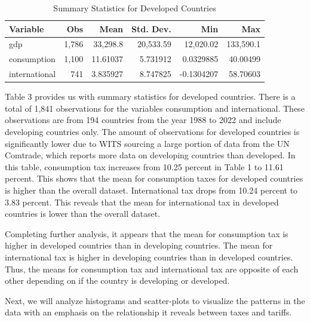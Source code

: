 \documentclass[12pt]{article}
\begin{document}
\begin{table}[h!]
\centering
\caption{Summary Statistics for Developed Countries}
\label{tab:summary_stats}
\begin{tabular}{lrrrrr}
\hline
\textbf{Variable} & \textbf{Obs} & \textbf{Mean} & \textbf{Std. Dev.} & \textbf{Min} & \textbf{Max} \\
\hline
gdp              & 1,786        & 33,298.8      & 20,533.59          & 12,020.02    & 133,590.1    \\
consumption      & 1,100        & 11.61037      & 5.731912           & 0.0329885    & 40.00499     \\
international    & 741          & 3.835927      & 8.747825           & -0.1304207   & 58.70603     \\
\hline
\end{tabular}
\end{table}

Table 3 provides us with summary statistics for developed countries. There is a total of 1,841 observations for the variables consumption and international. These observations are from 194 countries from the year 1988 to 2022 and include developing countries only. The amount of observations for developed countries is significantly lower due to WITS sourcing a large portion of data from the UN Comtrade, which reports more data on developing countries than developed. In this table, consumption tax increases from 10.25 percent in Table 1 to 11.61 percent. This shows that the mean for consumption taxes for developed countries is higher than the overall dataset.  International tax drops from 10.24 percent to 3.83 percent. This reveals that the mean for international tax in developed countries is lower than the overall dataset. 

Completing further analysis, it appears that the mean for consumption tax is higher in developed countries than in developing countries. The mean for international tax is higher in developing countries than in developed countries. Thus, the means for consumption tax and international tax are opposite of each other depending on if the country is developing or developed. 


Next, we will analyze histograms and scatter-plots to visualize the patterns in the data with an emphasis on the relationship it reveals between taxes and tariffs. 
\end{document}

